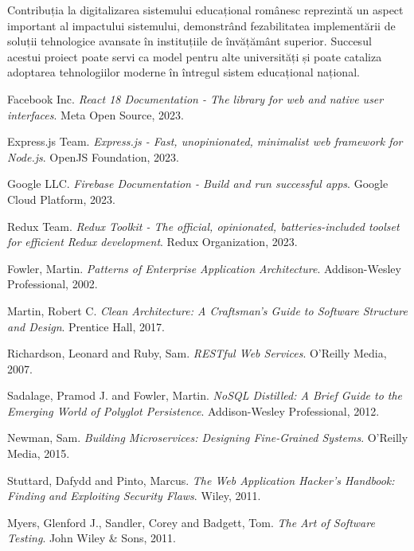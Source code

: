 \documentclass[12pt,a4paper]{report}
\begin{document}
Contribuția la digitalizarea sistemului educațional românesc reprezintă un aspect important al impactului sistemului, demonstrând fezabilitatea implementării de soluții tehnologice avansate în instituțiile de învățământ superior. Succesul acestui proiect poate servi ca model pentru alte universități și poate cataliza adoptarea tehnologiilor moderne în întregul sistem educațional național.


\begin{thebibliography}{20}

Facebook Inc. 
\textit{React 18 Documentation - The library for web and native user interfaces}. 
Meta Open Source, 2023.

Express.js Team. 
\textit{Express.js - Fast, unopinionated, minimalist web framework for Node.js}. 
OpenJS Foundation, 2023.

Google LLC. 
\textit{Firebase Documentation - Build and run successful apps}. 
Google Cloud Platform, 2023.

Redux Team. 
\textit{Redux Toolkit - The official, opinionated, batteries-included toolset for efficient Redux development}. 
Redux Organization, 2023.

Fowler, Martin. 
\textit{Patterns of Enterprise Application Architecture}. 
Addison-Wesley Professional, 2002.

Martin, Robert C. 
\textit{Clean Architecture: A Craftsman's Guide to Software Structure and Design}. 
Prentice Hall, 2017.

Richardson, Leonard and Ruby, Sam. 
\textit{RESTful Web Services}. 
O'Reilly Media, 2007.

Sadalage, Pramod J. and Fowler, Martin. 
\textit{NoSQL Distilled: A Brief Guide to the Emerging World of Polyglot Persistence}. 
Addison-Wesley Professional, 2012.

Newman, Sam. 
\textit{Building Microservices: Designing Fine-Grained Systems}. 
O'Reilly Media, 2015.

Stuttard, Dafydd and Pinto, Marcus. 
\textit{The Web Application Hacker's Handbook: Finding and Exploiting Security Flaws}. 
Wiley, 2011.

Myers, Glenford J., Sandler, Corey and Badgett, Tom. 
\textit{The Art of Software Testing}. 
John Wiley \& Sons, 2011.


\end{thebibliography}
\end{document}

